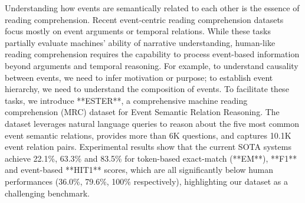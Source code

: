 Understanding how events are semantically related to each other is the essence of reading comprehension. Recent event-centric reading comprehension datasets focus mostly on event arguments or temporal relations. While these tasks partially evaluate machines' ability of narrative understanding, human-like reading comprehension requires the capability to process event-based information beyond arguments and temporal reasoning. For example, to understand causality between events, we need to infer motivation or purpose; to establish event hierarchy, we need to understand the composition of events. To facilitate these tasks, we introduce **ESTER**, a comprehensive machine reading comprehension (MRC) dataset for Event Semantic Relation Reasoning. The dataset leverages natural language queries to reason about the five most common event semantic relations, provides more than 6K questions, and captures 10.1K event relation pairs. Experimental results show that the current SOTA systems achieve 22.1\%, 63.3\% and 83.5\% for token-based exact-match (**EM**), **F1** and event-based **HIT\@1** scores, which are all significantly below human performances (36.0\%, 79.6\%, 100\% respectively), highlighting our dataset as a challenging benchmark.
